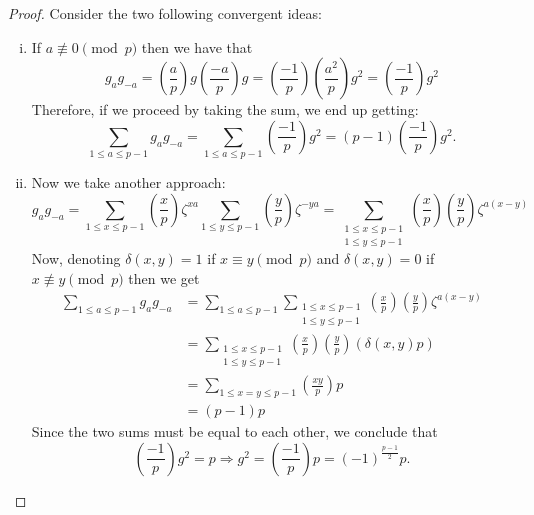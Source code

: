 \begin{proof}
   Consider the two following convergent ideas:
   \begin{enumerate}[i.]
      \item If \(a \not\equiv 0 \pmod{p}\) then we have that  
         \[
            g_{a}g_{-a} = \left( \frac{a}{p} \right) g \left( \frac{-a}{p}
            \right) g 
            = \left( \frac{-1}{p} \right) \left( \frac{a^2}{p} \right) g^2 
            = \left( \frac{-1}{p} \right)g^2 
         \]
         Therefore, if we proceed by taking the sum, we end up getting:
         \[
            \sum_{1 \leqslant a \leqslant p-1} g_a g_{-a} = \sum_{1 \leqslant a
            \leqslant p-1} \left( \frac{-1}{p} \right) g^2 = (p-1) \left(
            \frac{-1}{p} \right) g^2.
         \] 
      \item Now we take another approach:
         \[
            g_a g_{-a} = \sum_{1 \leqslant x \leqslant p-1} \left( \frac{x}{p}
            \right) \zeta^{xa} \sum_{1 \leqslant y \leqslant p-1} \left(
            \frac{y}{p} \right) \zeta^{-ya}
            = 
            \sum_{\substack{1 \leqslant x \leqslant p-1\\ 1 \leqslant y
            \leqslant p-1}} \left( \frac{x}{p} \right)  \left( \frac{y}{p}
            \right) \zeta^{a(x-y)}
         \] 
         Now, denoting \(\delta(x, y) = 1\) if  \(x \equiv y \pmod{p}\) and
         \(\delta(x,y)= 0\) if  \(x \not\equiv y\pmod{p}\) then we get 
         \begin{align*}
            \sum_{1 \leqslant a \leqslant p-1} g_a g_{-a} 
            &= 
            \sum_{1 \leqslant a \leqslant p-1} \sum_{\substack{1 \leqslant x
            \leqslant p-1 \\ 1 \leqslant y \leqslant p-1}} \left( \frac{x}{p}
            \right) \left( \frac{y}{p} \right) \zeta^{a(x-y)}\\
            &= \sum_{\substack{1 \leqslant x \leqslant p-1 \\ 1 \leqslant y
            \leqslant p-1}} \left( \frac{x}{p} \right) \left( \frac{y}{p}
            \right) (\delta(x, y)p) \\
            &= \sum_{1 \leqslant x = y \leqslant p-1} \left( \frac{xy}{p}
            \right) p \\
            &= (p-1)p
         \end{align*}
         Since the two sums must be equal to each other, we conclude that 
         \[
            \left( \frac{-1}{p} \right) g^2 = p \Rightarrow g^2 = \left(
            \frac{-1}{p} \right) p = (-1)^{\frac{p-1}{2}} p.
         \] 
   \end{enumerate}
\end{proof}

